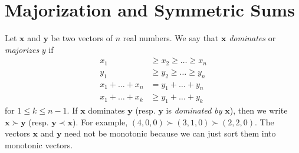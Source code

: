 \documentclass{subfile}
\begin{document}
	\section{Majorization and Symmetric Sums}\label{sec:mazorization}
	
	Let $\mathbf{x}$ and $\mathbf{y}$ be two vectors of $n$ real numbers. We say that $\mathbf{x}$ \textit{dominates} or \textit{majorizes} $y$ if
		\begin{align*}
			x_{1}
				& \geq x_{2}\geq \ldots\geq x_{n}\\
			y_{1}
				& \geq y_{2}\geq \ldots\geq y_{n}\\
			x_{1}+\ldots+x_{n}
				& = y_{1}+\ldots+y_{n}\\
			x_{1}+\ldots+x_{k}
				& \geq y_{1}+\ldots+y_{k}
		\end{align*}
	for $1\leq k\leq n-1$. If $\mathbf{x}$ dominates $\mathbf{y}$ (resp. $\mathbf{y}$ is \textit{dominated by} $\mathbf{x}$), then we write $\mathbf{x}\succ\mathbf{y}$ (resp. $\mathbf{y}\prec\mathbf{x}$). For example, $(4,0,0)\succ(3,1,0)\succ(2,2,0)$. The vectors $\mathbf{x}$ and $\mathbf{y}$ need not be monotonic because we can just sort them into monotonic vectors.
	
\end{document}
